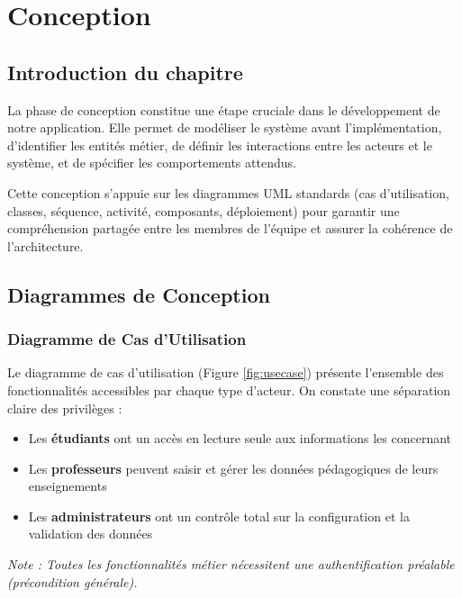 \documentclass[12pt,a4paper]{report}
\begin{document}
\chapter{Conception}

\section{Introduction du chapitre}

La phase de conception constitue une étape cruciale dans le développement de notre application. Elle permet de modéliser le système avant l'implémentation, d'identifier les entités métier, de définir les interactions entre les acteurs et le système, et de spécifier les comportements attendus.

Cette conception s'appuie sur les diagrammes UML standards (cas d'utilisation, classes, séquence, activité, composants, déploiement) pour garantir une compréhension partagée entre les membres de l'équipe et assurer la cohérence de l'architecture.

\section{Diagrammes de Conception}

\subsection{Diagramme de Cas d'Utilisation}

Le diagramme de cas d'utilisation (Figure \ref{fig:usecase}) présente l'ensemble des fonctionnalités accessibles par chaque type d'acteur. On constate une séparation claire des privilèges :

\begin{itemize}[itemsep=0.5em]
    \item Les \textbf{étudiants} ont un accès en lecture seule aux informations les concernant
    \item Les \textbf{professeurs} peuvent saisir et gérer les données pédagogiques de leurs enseignements
    \item Les \textbf{administrateurs} ont un contrôle total sur la configuration et la validation des données
\end{itemize}

\textit{Note : Toutes les fonctionnalités métier nécessitent une authentification préalable (précondition générale).}
\end{document}

